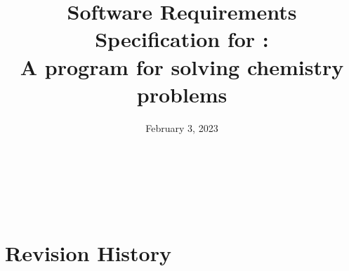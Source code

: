 \documentclass[12pt]{article}
\begin{document}
\title{Software Requirements Specification for \progname:\\
A program for solving chemistry problems} 
\author{\authname}
\date{February 3, 2023}
	
\maketitle
\thispagestyle{empty}

~\newpage


\tableofcontents

~\newpage

\section*{Revision History} \label{sec_revHist}
\end{document}
